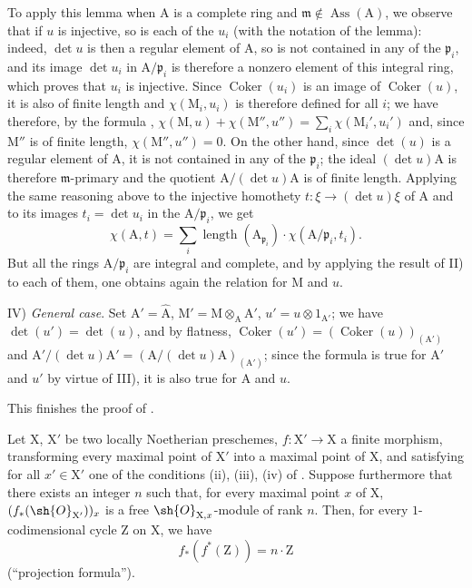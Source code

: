 To apply this lemma when $\mathrm{A}$ is a complete ring and $\mathfrak{m}\notin\operatorname{Ass}(\mathrm{A})$, we observe that if $u$ is injective, so is each of the $u_i$ (with the notation of the lemma): indeed, $\det u$ is then a regular element of $\mathrm{A}$, so is not contained in any of the $\mathfrak{p}_i$, and its image $\det u_i$ in $\mathrm{A}/\mathfrak{p}_i$ is therefore a nonzero element of this integral ring, which proves that $u_i$ is injective.
Since $\operatorname{Coker}(u_i)$ is an image of $\operatorname{Coker}(u)$, it is also of finite length and $\chi(\mathrm{M}_i,u_i)$ is therefore defined for all $i$; we have therefore, by the formula , $\chi(\mathrm{M},u)+\chi(\mathrm{M}'',u'')=\sum_i\chi(\mathrm{M}_i',u_i')$ and, since $\mathrm{M}''$ is of finite length, $\chi(\mathrm{M}'',u'')=0$.
On the other hand, since $\det(u)$ is a regular element of $\mathrm{A}$, it is not contained in any of the $\mathfrak{p}_i$; the ideal $(\det u)\mathrm{A}$ is therefore $\mathfrak{m}$-primary and the quotient $\mathrm{A}/(\det u)\mathrm{A}$ is of finite length.
Applying the same reasoning above to the injective homothety $t:\xi\to(\det u)\xi$ of $\mathrm{A}$ and to its images $t_i=\det u_i$ in the $\mathrm{A}/\mathfrak{p}_i$, we get
\[
  \chi(\mathrm{A},t)=\sum_i\operatorname{length}(\mathrm{A}_{\mathfrak{p}_i})\cdot\chi(\mathrm{A}/\mathfrak{p}_i,t_i).
\]
But all the rings $\mathrm{A}/\mathfrak{p}_i$ are integral and complete, and by applying the result of II) to each of them, one obtains again the relation  for $\mathrm{M}$ and $u$.

IV) \emph{General case}.
Set $\mathrm{A}'=\widehat{\mathrm{A}}$, $\mathrm{M}'=\mathrm{M}\otimes_{\mathrm{A}}\mathrm{A}'$, $u'=u\otimes 1_{\mathrm{A}'}$; we have $\det(u')=\det(u)$, and by flatness, $\operatorname{Coker}(u')=(\operatorname{Coker}(u))_{(\mathrm{A}')}$ and $\mathrm{A}'/(\det u)\mathrm{A}'=(\mathrm{A}/(\det u)\mathrm{A})_{(\mathrm{A}')}$; since the formula  is true for $\mathrm{A}'$ and $u'$ by virtue of III), it is also true for $\mathrm{A}$ and $u$.

This finishes the proof of .

\begin{proposition}[21.10.18]
\label{IV.21.10.18}
Let $\mathrm{X}$, $\mathrm{X}'$ be two locally Noetherian preschemes, $f:\mathrm{X}'\to\mathrm{X}$ a finite morphism, transforming every maximal point of $\mathrm{X}'$ into a maximal point of $\mathrm{X}$, and satisfying for all $x'\in\mathrm{X}'$ one of the conditions (ii), (iii), (iv) of .
Suppose furthermore that there exists an integer $n$ such that, for every maximal point $x$ of $\mathrm{X}$, $(f_*(\sh{O}_{\mathrm{X}'}))_x$ is a free $\sh{O}_{\mathrm{X},x}$-module of rank $n$.
Then, for every $1$-codimensional cycle $\mathrm{Z}$ on $\mathrm{X}$, we have
\[
\label{IV.21.10.18.1}
  f_*(f^*(\mathrm{Z}))=n\cdot\mathrm{Z}
  \tag{21.10.18.1}
\]
(``projection formula'').
\end{proposition}

